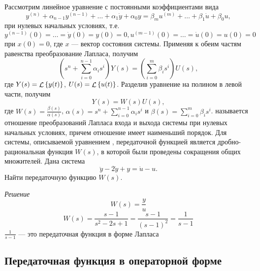 \documentclass[../../TAU.tex]{subfiles}
\begin{document}
    Рассмотрим линейное уравнение с постоянными коэффициентами вида
    \begin{equation}\label{EQ_ODU}
    y^{(n)} + \alpha_{n-1}y^{(n-1)} + \ldots + \alpha_1 \dot y + \alpha_0y = \beta_m u^{(m)} + \ldots + \beta_1 \dot u + \beta_0 u,
    \end{equation}
    при нулевых начальных условиях, т.е. 
    $y^{(n-1)} (0) = \ldots = \dot y(0) = y(0) = 0, u^{(m-1)} (0) = \ldots = \dot u(0) = u(0) = 0$ при $x(0)=0$, где $x$ --- вектор состояния системы.
    Применяя к обеим частям равенства преобразование Лапласа, получим
    \begin{equation}\label{EQ_W}
    \left(s^n + \sum_{i=0}^{n-1}\alpha_is^i\right) Y(s) = \left(\sum_{i=0}^{m}\beta_is^i\right) U(s),
    \end{equation}
    где $Y(s) = \mathop{\mathcal{L}}\nolimits\left\{y(t)\right\}$, $U(s) = \mathop{\mathcal{L}}\nolimits\left\{u(t)\right\}$. Разделив уравнение  на полином в левой части, получим
    \begin{equation}  
        Y(s) = W(s)U(s),
    \end{equation}
    где 
    $W(s) = \frac{\beta(s)}{\alpha(s)}$, 
    $\alpha(s) = s^n + \sum_{i=0}^{n-1}\alpha_is^i$ и 
    $\beta(s) = \sum_{i=0}^{m}\beta_is^i$.
     называется отношение преобразований Лапласа входа и выхода системы при нулевых начальных условиях, причем отношение имеет наименьший порядок.
    Для системы, описываемой уравнением , передаточной функцией является дробно-рациональная функция $W(s)$, в которой были проведены сокращения общих множителей.
    \examp Дана система
    $$
        \ddot y - 2\dot y + y = \dot u - u.
    $$
    Найти передаточную функцию $W(s)$.

    \textit{Решение}
    {
        $$
            W(s)=\frac{y}{u}
        $$
        $$
            W(s)=\frac{s-1}{s^2-2s+1}=\frac{s-1}{(s-1)^2}=\frac{1}{s-1}
        $$
        $\frac{1}{s-1}$ --- это передаточная функция в форме Лапласа
    }

\subsection{Передаточная функция в операторной форме} 
\end{document}
